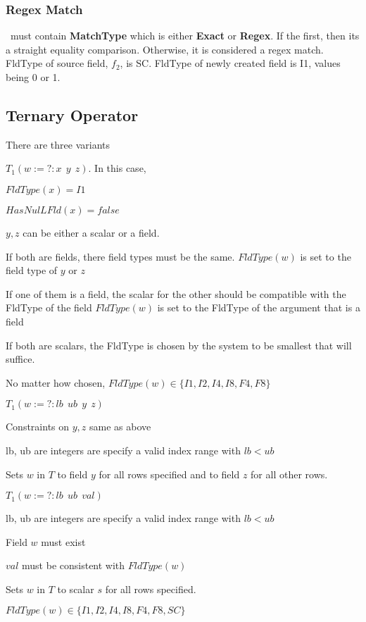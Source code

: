 \subsubsection{Regex Match}
\label{regex}

\Args\ must contain {\bf MatchType} which is either {\bf Exact} or {\bf Regex}. If the first, then its a straight equality comparison. Otherwise, it is considered a regex match. FldType of source field, \(f_2\), is SC. FldType of newly created field is I1, values being 0 or 1.

\subsection{Ternary Operator}
\label{ternary_op}

There are three variants
\be
\item \(T_1(w := ?\!: x~~y~~z)\). In this case,
\bi
\item \(FldType(x) = I1\)
\item \(HasNulLFld(x) = false\)
\item \(y, z\) can be either a scalar or a field. 
\item If both are fields, there field types must be the same. 
\(FldType(w)\) is set to the field type of \(y\) or \(z\)
\item If one of them is a field, the scalar for the other should be compatible
with the FldType of the field
\(FldType(w)\) is set to the FldType of the argument that is a field
\item If both are scalars, the FldType is chosen by the system to be smallest
that will suffice.
\item No matter how chosen, \(FldType(w) \in \{I1, I2, I4, I8, F4, F8\}\)
\ei

\item \(T_1(w := ?\!: lb~~ub~~y~~z)\) 
\bi
\item Constraints on \(y, z\) same as above
\item lb, ub are integers are specify a valid index range with \(lb < ub\)
\item Sets \(w\) in \(T\) to field \(y\) for all rows specified and to field
\(z\) for all other rows. 
\ei

\item \(T_1(w := ?\!: lb~~ub~~val)\) 
\bi
\item lb, ub are integers are specify a valid index range with \(lb < ub\)
\item Field \(w\) must exist 
\item \(val\) must be consistent with \(FldType(w)\)
\item Sets \(w\) in \(T\) to scalar \(s\) for all rows specified. 
\item \(FldType(w) \in \{I1, I2,  I4, I8, F4, F8, SC\}\)
\ei
\ee


